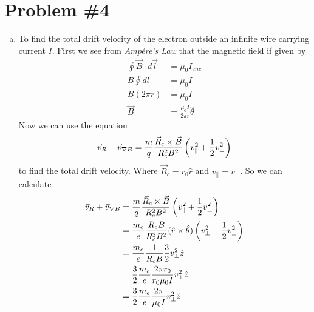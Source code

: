 \documentclass[11pt]{article}
\numberwithin{equation}{section}
\newcommand{\grad}{\bold\nabla}
\begin{document}
\section{Problem \#4}
\begin{enumerate}[(a)]
\item
To find the total drift velocity of the electron outside an infinite wire carrying current $I$. First we see from \emph{Amp\'{e}re's Law} that the magnetic field if given by
\begin{align*}
\oint \vec{B}\cdot d\vec{l} &= \mu_0I_{enc}\\
B\oint dl &= \mu_0I\\
B(2\pi r) &= \mu_0I\\
\vec{B} &= \frac{\mu_0I}{2\pi r}\hat{\theta}
\end{align*}
Now we can use the equation
$$\vec{v}_R+\vec{v}_{\grad B} = \frac{m}{q}\frac{\vec{R}_c\times\vec{B}}{R_c^2B^2}\left(v_{\parallel}^2+\frac{1}{2}v_{\perp}^2\right)$$
to find the total drift velocity. Where $\vec{R}_c = r_0\hat{r}$ and $v_{\parallel} = v_{\perp}$. So we can calculate
\begin{align*}
\vec{v}_R+\vec{v}_{\grad B} &= \frac{m}{q}\frac{\vec{R}_c\times\vec{B}}{R_c^2B^2}\left(v_{\parallel}^2+\frac{1}{2}v_{\perp}^2\right)\\
&= \frac{m_e}{e} \frac{R_cB}{R_c^2B^2}(\hat{r}\times\hat{\theta})\left(v_{\perp}^2+\frac{1}{2}v_{\perp}^2\right)\\
&= \frac{m_e}{e} \frac{1}{R_cB}\frac{3}{2}v_{\perp}^2\hat{z}\\
&= \frac{3}{2}\frac{m_e}{e} \frac{2\pi r_0}{r_0\mu_0I}v_{\perp}^2\hat{z}\\
&= \frac{3}{2}\frac{m_e}{e}\frac{2\pi}{\mu_0I}v_{\perp}^2\hat{z}
\end{align*}
\end{enumerate}
\end{document}
